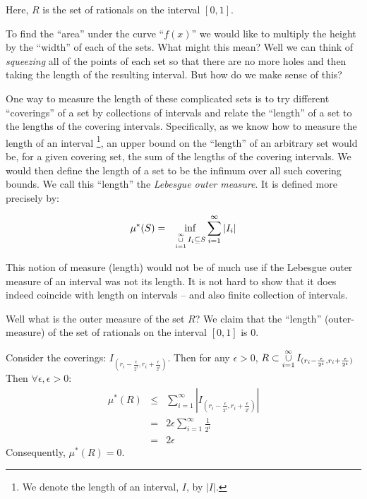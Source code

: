 \documentclass{article}
\begin{document}
Here, $R$ is the set of rationals on the interval $[0, 1]$.

To find the ``area'' under the curve ``$f(x)$'' we would like to multiply the 
height by the ``width'' of each of the sets. What might this mean?
Well we can think of {\em squeezing\/} all of the points of each set so that there are 
no more holes and then taking the length of the resulting interval.
But how do we make sense of this?

One way to measure the length of these complicated sets is to try different ``coverings'' 
of a set by collections of intervals and relate the ``length'' of a set to the lengths of
the covering intervals. Specifically, as
we know how to measure the length of an interval%
\footnote{We denote the length of an interval, $I$, by $|I|$.}, an upper bound on 
the ``length'' of an arbitrary set would be, for a given covering set, 
the sum of the lengths of the covering intervals.
We would then define the length of a set to be the infimum over all such covering bounds.
We call this ``length'' the {\em Lebesgue outer measure\/}. It is defined more precisely by:

\begin{eqnarray}
	\mu^*(S) & = & \inf_{\mathop{\cup}_{i=1}^\infty\limits I_i \subseteq S} \sum_{i=1}^\infty |I_i| 
\end{eqnarray}

This notion of measure (length) would not be of much use if the Lebesgue outer measure of
an interval was not its length.
It is not hard to show that it does indeed coincide with length on 
intervals -- and also finite collection of intervals.

Well what is the outer measure of the set $R$? We claim that the ``length'' 
(outer-measure) of the set of rationals on the interval $[0,1]$ is $0$.

Consider the coverings: $I_{(r_i - \frac{\epsilon}{2^i}, r_i + \frac{\epsilon}{2^i})}$. 
Then for any
$\epsilon > 0$, $R \subset \mathop{\cup}_{i=1}^\infty\limits I_{(r_i - \frac{\epsilon}{2^i}, r_i + \frac{\epsilon}{2^i})}$
Then $\forall \epsilon, \epsilon > 0$:
\begin{eqnarray}
\mu^*(R) & \le & \sum_{i=1}^\infty  |I_{(r_i - \frac{\epsilon}{2^i}, r_i + \frac{\epsilon}{2^i})}| \\
		 & = & 2 \epsilon \sum_{i=1}^\infty \frac{1}{2^i} \\
		 & = & 2 \epsilon
\end{eqnarray}
Consequently, $\mu^*(R) = 0$. 
\end{document}
